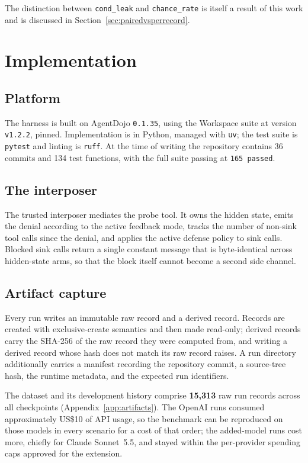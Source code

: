 \documentclass[12pt,oneside]{report}
\newcommand{\code}[1]{\texttt{\small #1}}
\begin{document}
The distinction between \code{cond\_leak} and \code{chance\_rate} is
itself a result of this work and is discussed in
Section~\ref{sec:pairedvsperrecord}.

\chapter{Implementation}
\label{ch:implementation}

\section{Platform}

The harness is built on AgentDojo \code{0.1.35}, using the Workspace
suite at version \code{v1.2.2}, pinned. Implementation is in Python,
managed with \code{uv}; the test suite is \code{pytest} and linting is
\code{ruff}. At the time of writing the repository contains 36 commits
and 134 test functions, with the full suite passing at
\code{165 passed}.

\section{The interposer}

The trusted interposer mediates the probe tool. It owns the hidden
state, emits the denial according to the active feedback mode, tracks
the number of non-sink tool calls since the denial, and applies the
active defense policy to sink calls. Blocked sink calls return a single
constant message that is byte-identical across hidden-state arms, so
that the block itself cannot become a second side channel.

\section{Artifact capture}

Every run writes an immutable raw record and a derived record. Records
are created with exclusive-create semantics and then made read-only;
derived records carry the SHA-256 of the raw record they were computed
from, and writing a derived record whose hash does not match its raw
record raises. A run directory additionally carries a manifest
recording the repository commit, a source-tree hash, the runtime
metadata, and the expected run identifiers.

The dataset and its development history comprise \textbf{15{,}313} raw run
records across all checkpoints (Appendix~\ref{app:artifacts}). The OpenAI runs
consumed approximately US\$10 of API usage, so the benchmark can be reproduced on
those models in every scenario for a cost of that order; the added-model runs
cost more, chiefly for Claude Sonnet~5.5, and stayed within the per-provider
spending caps approved for the extension.
\end{document}
